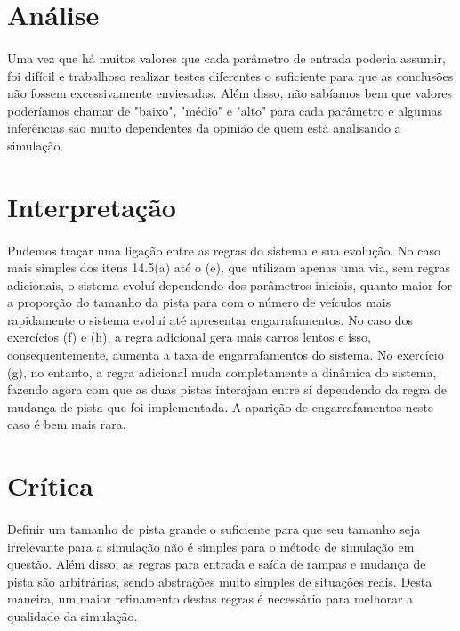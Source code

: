 \documentclass{article}
\begin{document}
\section{Análise}
\paragraph{}Uma vez que há muitos valores que cada parâmetro de entrada poderia assumir, foi difícil e trabalhoso realizar testes diferentes o suficiente para que as conclusões não fossem excessivamente enviesadas. Além disso, não sabíamos bem que valores poderíamos chamar de "baixo", "médio" e "alto" para cada parâmetro e algumas inferências são muito dependentes da opinião de quem está analisando a simulação.

\section{Interpretação}
\paragraph{}Pudemos traçar uma ligação entre as regras do sistema e sua evolução. No caso mais simples dos itens 14.5(a) até o (e), que utilizam apenas uma via, sem regras adicionais, o sistema evoluí dependendo dos parâmetros iniciais, quanto maior for a proporção do tamanho da pista para com o número de veículos mais rapidamente o sistema evoluí até apresentar engarrafamentos. No caso dos exercícios (f) e (h), a regra adicional gera mais carros lentos e isso, consequentemente, aumenta a taxa de engarrafamentos do sistema. No exercício (g), no entanto, a regra adicional muda completamente a dinâmica do sistema, fazendo agora com que as duas pistas interajam entre si dependendo da regra de mudança de pista que foi implementada. A aparição de engarrafamentos neste caso é bem mais rara.
 

\section{Crítica}
\paragraph{}Definir um tamanho de pista grande o suficiente para que seu tamanho seja irrelevante para a simulação não é simples para o método de simulação em questão. Além disso, as regras para entrada e saída de rampas e mudança de pista são arbitrárias, sendo abstrações muito simples de situações reais. Desta maneira, um maior refinamento destas regras é necessário para melhorar a qualidade da simulação. 
\end{document}

